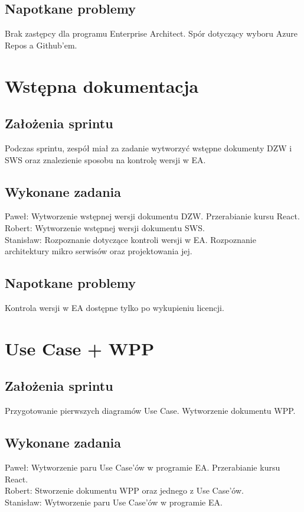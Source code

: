 \documentclass[a4paper,11pt]{report}
\begin{document}
\subsection {Napotkane problemy}
Brak zastępcy dla programu Enterprise Architect. Spór dotyczący wyboru Azure Repos a Github'em.

\section {Wstępna dokumentacja}
\subsection {Założenia sprintu}
Podczas sprintu, zespół miał za zadanie wytworzyć wstępne dokumenty DZW i SWS oraz znalezienie sposobu na kontrolę wersji w EA.
\subsection {Wykonane zadania}
Paweł: Wytworzenie wstępnej wersji dokumentu DZW. Przerabianie kursu React.\\
Robert: Wytworzenie wstępnej wersji dokumentu SWS.\\
Stanisław: Rozpoznanie dotyczące kontroli wersji w EA. Rozpoznanie architektury mikro serwisów oraz projektowania jej.\\
\subsection {Napotkane problemy} 
Kontrola wersji w EA dostępne tylko po wykupieniu licencji.

\section {Use Case + WPP}
\subsection {Założenia sprintu}
Przygotowanie pierwszych diagramów Use Case. Wytworzenie dokumentu WPP.
\subsection {Wykonane zadania}
Paweł: Wytworzenie paru Use Case'ów w programie EA. Przerabianie kursu React.\\
Robert: Stworzenie dokumentu WPP oraz jednego z Use Case'ów.\\
Stanisław: Wytworzenie paru Use Case'ów w programie EA.\\
\end{document}

